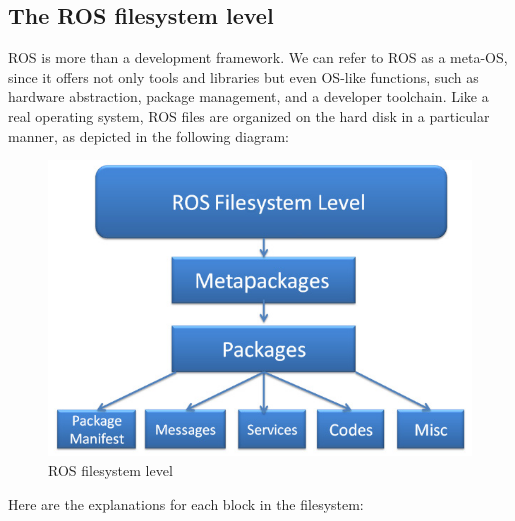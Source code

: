 \documentclass[../../main]{subfiles}
\begin{document}
\subsection{The ROS filesystem level}
ROS is more than a development framework. We can refer to ROS as a meta-OS, since
it offers not only tools and libraries but even OS-like functions, such as hardware
abstraction, package management, and a developer toolchain. Like a real operating
system, ROS files are organized on the hard disk in a particular manner, as depicted in the
following diagram:
\begin{figure}[ht]
    \centering
    \includegraphics{img/filesystem.jpg}
    \caption{ROS filesystem level}
\end{figure}
Here are the explanations for each block in the filesystem:
\end{document}
